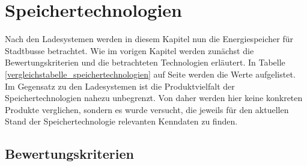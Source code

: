 \chapter{Speichertechnologien} %
Nach den Ladesystemen werden in diesem Kapitel nun die Energiespeicher für Stadtbusse betrachtet. Wie im vorigen Kapitel werden zunächst die Bewertungskriterien und die betrachteten Technologien erläutert. In Tabelle \ref{vergleichstabelle_speichertechnologien} auf Seite \pageref{vergleichstabelle_speichertechnologien} werden die Werte aufgelistet.\\
Im Gegensatz zu den Ladesystemen ist die Produktvielfalt der Speichertechnologien nahezu unbegrenzt. Von daher werden hier keine konkreten Produkte verglichen, sondern es wurde versucht, die jeweils für den aktuellen Stand der Speichertechnologie relevanten Kenndaten zu finden.
\section{Bewertungskriterien} %

